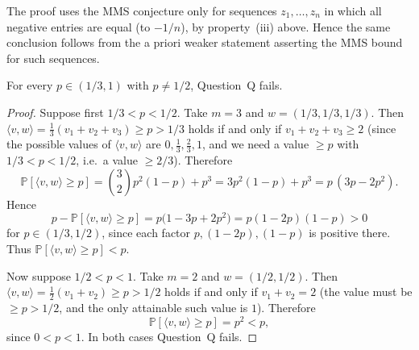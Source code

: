 \begin{remark}
The proof uses the MMS conjecture only for sequences $z_1,\dots,z_n$ in which all negative entries are equal (to $-1/n$), by property~(iii) above. Hence the same conclusion follows from the a priori weaker statement asserting the MMS bound for such sequences.
\end{remark}

\begin{proposition}\label{prop:counterexample}
For every $p\in(1/3,1)$ with $p\neq 1/2$, Question~Q fails.
\end{proposition}

\begin{proof}
Suppose first $1/3<p<1/2$. Take $m=3$ and $w=(1/3,1/3,1/3)$. Then $\langle v,w\rangle=\tfrac13(v_1+v_2+v_3)\ge p>1/3$ holds if and only if $v_1+v_2+v_3\ge 2$ (since the possible values of $\langle v,w\rangle$ are $0,\tfrac13,\tfrac23,1$, and we need a value $\ge p$ with $1/3<p<1/2$, i.e.\ a value $\ge 2/3$). Therefore
\[
\mathbb P[\langle v,w\rangle\ge p]=\binom{3}{2}p^2(1-p)+p^3=3p^2(1-p)+p^3=p\,(3p-2p^2).
\]
Hence
\[
p-\mathbb P[\langle v,w\rangle\ge p]=p\big(1-3p+2p^2\big)=p(1-2p)(1-p)>0
\]
for $p\in(1/3,1/2)$, since each factor $p,(1-2p),(1-p)$ is positive there. Thus $\mathbb P[\langle v,w\rangle\ge p]<p$.

Now suppose $1/2<p<1$. Take $m=2$ and $w=(1/2,1/2)$. Then $\langle v,w\rangle=\tfrac12(v_1+v_2)\ge p>1/2$ holds if and only if $v_1+v_2=2$ (the value must be $\ge p>1/2$, and the only attainable such value is $1$). Therefore
\[
\mathbb P[\langle v,w\rangle\ge p]=p^2<p,
\]
since $0<p<1$. In both cases Question~Q fails.
\end{proof}
